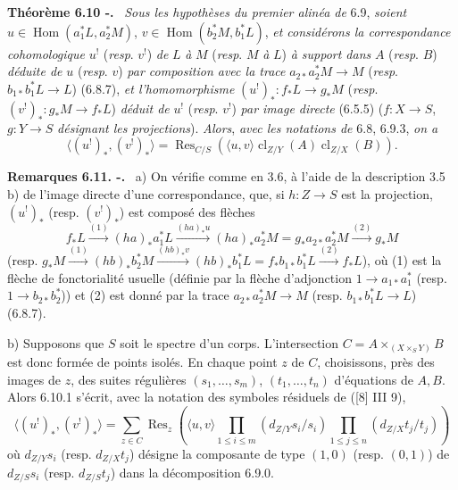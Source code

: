 \documentclass[11pt]{article}
\newenvironment{statement}[1]{\par\medskip\noindent\textbf{#1.}\ }{\par\medskip}
\DeclareMathOperator{\Hom}{Hom}
\providecommand{\cl}{\operatorname{cl}}
\providecommand{\Hom}{\operatorname{Hom}}
\providecommand{\cl}{\operatorname{cl}}
\providecommand{\Hom}{\operatorname{Hom}}
\providecommand{\cl}{\operatorname{cl}}
\begin{document}
\begin{statement}{Théorème 6.10 -}
\emph{Sous les hypothèses du premier alinéa de} 6.9, \emph{soient} $u\in\Hom(a_1^*L,a_2^*M)$, $v\in\Hom(b_2^*M,b_1^*L)$, \emph{et considérons la correspondance cohomologique} $u^!$ (\emph{resp}. $v^!$) \emph{de} $L$ \emph{à} $M$ (\emph{resp}. $M$ \emph{à} $L$) \emph{à support dans} $A$ (\emph{resp}. $B$) \emph{déduite de} $u$ (\emph{resp}. $v$) \emph{par composition avec la trace} $a_{2*}a_2^*M\to M$ (\emph{resp}. $b_{1*}b_1^*L\to L$) (6.8.7), \emph{et l'homomorphisme} $(u^!)_*:f_*L\to g_*M$ (\emph{resp}. $(v^!)_*:g_*M\to f_*L$) \emph{déduit de} $u^!$ (\emph{resp}. $v^!$) \emph{par image directe} (6.5.5) ($f:X\to S$, $g:Y\to S$
\emph{désignant les projections}). \emph{Alors}, \emph{avec les notations de} 6.8, 6.9.3, \emph{on a}
\begin{equation}
\tag{6.10.1}
\langle (u^!)_*,(v^!)_*\rangle=\operatorname{Res}_{C/S}(\langle u,v\rangle\cl_{Z/Y}(A)\cl_{Z/X}(B)).
\end{equation}
\end{statement}

\begin{statement}{Remarques 6.11. -}
a) On vérifie comme en 3.6, à l'aide de la description 3.5 b) de l'image directe d'une correspondance, que, si $h:Z\to S$ est la projection, $(u^!)_*$ (resp. $(v^!)_*$) est composé des flèches
\[
f_*L\xrightarrow{(1)}(ha)_*a_1^*L\xrightarrow{(ha)_*u}(ha)_*a_2^*M=g_*a_{2*}a_2^*M\xrightarrow{(2)}g_*M
\]
(resp. $g_*M\xrightarrow{(1)}(hb)_*b_2^*M\xrightarrow{(hb)_*v}(hb)_*b_1^*L=f_*b_{1*}b_1^*L\xrightarrow{(2)}f_*L$),
où (1) est la flèche de fonctorialité usuelle (définie par la flèche d'adjonction $1\to a_{1*}a_1^*$ (resp. $1\to b_{2*}b_2^*$)) et (2) est donné par la trace $a_{2*}a_2^*M\to M$ (resp. $b_{1*}b_1^*L\to L$) (6.8.7).

b) Supposons que $S$ soit le spectre d'un corps. L'intersection $C=A\times_{(X\times_S Y)}B$ est donc formée de points isolés. En chaque point $z$ de $C$, choisissons, près des images de $z$, des suites régulières $(s_1,\ldots,s_m)$, $(t_1,\ldots,t_n)$ d'équations de $A,B$. Alors 6.10.1 s'écrit, avec la notation des symboles résiduels de ([8] III 9),
\begin{equation}
\tag{6.11.1}
\langle (u^!)_*,(v^!)_*\rangle=
\sum_{z\in C}\operatorname{Res}_z\left(\langle u,v\rangle
\prod_{1\le i\le m}(d_{Z/Y}s_i/s_i)
\prod_{1\le j\le n}(d_{Z/X}t_j/t_j)\right)
\end{equation}
où $d_{Z/Y}s_i$ (resp. $d_{Z/X}t_j$) désigne la composante de type $(1,0)$ (resp. $(0,1)$) de $d_{Z/S}s_i$ (resp. $d_{Z/S}t_j$) dans la décomposition 6.9.0.
\end{statement}
\end{document}
